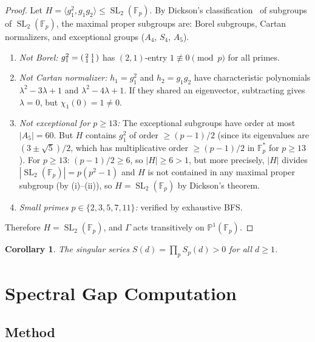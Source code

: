 \documentclass[11pt,a4paper]{amsart}
\newtheorem{corollary}[theorem]{Corollary}
\theoremstyle{definition}
\DeclareMathOperator{\SL}{SL}
\begin{document}
\begin{proof}
Let $H = \langle g_1^2, g_1 g_2 \rangle \leq \SL_2(\mathbb{F}_p)$. By Dickson's classification~\cite{Dickson1901} of subgroups of $\SL_2(\mathbb{F}_p)$, the maximal proper subgroups are: Borel subgroups, Cartan normalizers, and exceptional groups ($A_4$, $S_4$, $A_5$).

\begin{enumerate}[label=(\roman*)]
\item \emph{Not Borel:} $g_1^2 = \begin{psmallmatrix} 2&1\\1&1 \end{psmallmatrix}$ has $(2,1)$-entry $1 \not\equiv 0 \pmod{p}$ for all primes.

\item \emph{Not Cartan normalizer:} $h_1 = g_1^2$ and $h_2 = g_1 g_2$ have characteristic polynomials $\lambda^2 - 3\lambda + 1$ and $\lambda^2 - 4\lambda + 1$. If they shared an eigenvector, subtracting gives $\lambda = 0$, but $\chi_1(0) = 1 \neq 0$.

\item \emph{Not exceptional for $p \geq 13$:} The exceptional subgroups have order at most $|A_5| = 60$. But $H$ contains $g_1^2$ of order $\geq (p-1)/2$ (since its eigenvalues are $(3 \pm \sqrt{5})/2$, which has multiplicative order $\geq (p-1)/2$ in $\mathbb{F}_p^*$ for $p \geq 13$). For $p \geq 13$: $(p-1)/2 \geq 6$, so $|H| \geq 6 > 1$, but more precisely, $|H|$ divides $|\SL_2(\mathbb{F}_p)| = p(p^2-1)$ and $H$ is not contained in any maximal proper subgroup (by (i)--(ii)), so $H = \SL_2(\mathbb{F}_p)$ by Dickson's theorem.

\item \emph{Small primes $p \in \{2,3,5,7,11\}$:} verified by exhaustive BFS.
\end{enumerate}
Therefore $H = \SL_2(\mathbb{F}_p)$, and $\Gamma$ acts transitively on $\mathbb{P}^1(\mathbb{F}_p)$.
\end{proof}

\begin{corollary}\label{cor:singular}
The singular series $S(d) = \prod_p S_p(d) > 0$ for all $d \geq 1$.
\end{corollary}

\section{Spectral Gap Computation}

\subsection{Method}
\end{document}
